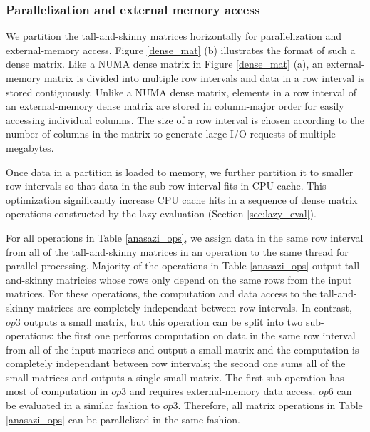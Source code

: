 \subsubsection{Parallelization and external memory access}
We partition the tall-and-skinny matrices horizontally for parallelization
and external-memory access. Figure \ref{dense_mat} (b) illustrates the format
of such a dense matrix. Like a NUMA dense matrix in Figure \ref{dense_mat} (a),
an external-memory matrix is divided into multiple row intervals and data
in a row interval is stored contiguously. Unlike a NUMA dense matrix, elements
in a row interval of an external-memory dense matrix are stored in column-major order
for easily accessing individual columns. The size of a row interval is chosen
according to the number of columns in the matrix to generate large I/O requests
of multiple megabytes.

Once data in a partition is loaded to memory, we further partition it to
smaller row intervals so that data
in the sub-row interval fits in CPU cache.  This optimization significantly
increase CPU cache hits in a sequence of dense matrix operations constructed by
the lazy evaluation (Section \ref{sec:lazy_eval}).

For all operations in Table \ref{anasazi_ops}, we assign data in the same row
interval from all of the tall-and-skinny
matrices in an operation to the same thread for parallel processing.
Majority of the operations in Table \ref{anasazi_ops} output tall-and-skinny
matricies whose rows only depend on the same rows from the input matrices.
For these operations, the computation and data access to the tall-and-skinny
matrices are completely independant between row intervals. 
In contrast, $op3$ outputs a small matrix, but this operation can be split into
two sub-operations: the first one performs computation on data in the same row
interval from all of the input matrices and output a small matrix and the computation
is completely independant between row intervals; the second one sums all of
the small matrices and outputs a single small matrix. The first sub-operation
has most of computation in $op3$ and requires external-memory data access.
$op6$ can be evaluated in a similar fashion to $op3$. Therefore, all matrix
operations in Table \ref{anasazi_ops} can be parallelized in the same fashion.


